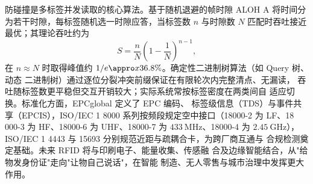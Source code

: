 防碰撞是多标签并发读取的核心算法。基于随机退避的帧时隙 ALOH
A 将时间分为若干时隙，每标签随机选一时隙应答，当标签数 $n$
 与时隙数 $N$ 匹配时吞吐接近最优；其理论吞吐约为
\begin{equation}
S = \frac{n}{N}\left(1-\frac{1}{N}\right)^{n-1},
\end{equation}
在 $n\approx N$ 时取得峰值约 $1/e\appro
x 36.8\%$。确定性二进制树算法（如 Query 树、动态
二进制树）通过逐位分裂冲突前缀保证在有限轮次内完整清点、无漏读，
吞吐随标签数更平稳但交互开销较大；实际系统常按标签密度在两类间自
适应切换。标准化方面，EPCglobal 定义了 EPC 编码、
标签级信息（TDS）与事件共享（EPCIS），ISO/IEC 1
8000 系列按频段规定空中接口（18000-2 为 LF、18
000-3 为 HF、18000-6 为 UHF、18000-7
 为 $433\ \mathrm{MHz}$、18000-4 为
 $2.45\ \mathrm{GHz}$），ISO/IEC 1
4443 与 15693 分别规范近距与疏耦合卡，为跨厂商互通与
合规检测奠定基础。未来 RFID 将与印刷电子、能量收集、传感融
合及边缘智能结合，从"给物发身份证"走向"让物自己说话"，在智能
制造、无人零售与城市治理中发挥更大作用。
